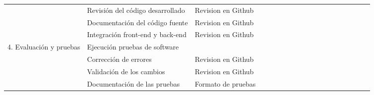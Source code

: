 \begin{table}[H]
\begin{adjustbox}{width={\textwidth},totalheight={\textheight},keepaspectratio}
\begin{tabular}{cp{10.555em}p{10.555em}rrrrrrrrrrrrrrrr}
        \cline{2-3}  & Revisión del código desarrollado & Revision en Github & \cellcolor[rgb]{ .886,  .937,  .855} & \cellcolor[rgb]{ .886,  .937,  .855} & \cellcolor[rgb]{ .886,  .937,  .855} & \cellcolor[rgb]{ .886,  .937,  .855} &   &   &   &   &   &   &   &   &   &   &   &  \bigstrut\\
        \cline{2-3}  & Documentación del código fuente & Revision en Github &   &   &   & \cellcolor[rgb]{ .663,  .816,  .557} & \cellcolor[rgb]{ .663,  .816,  .557} & \cellcolor[rgb]{ .663,  .816,  .557} &   &   &   &   &   &   &   &   &   &  \bigstrut\\
        \cline{2-3}  & Integración front-end y back-end & Revision en Github &   &   &   & \cellcolor[rgb]{ .886,  .937,  .855}\textcolor[rgb]{ .886,  .937,  .855}{} & \cellcolor[rgb]{ .886,  .937,  .855}\textcolor[rgb]{ .886,  .937,  .855}{} & \cellcolor[rgb]{ .886,  .937,  .855}\textcolor[rgb]{ .886,  .937,  .855}{} & \cellcolor[rgb]{ .886,  .937,  .855}\textcolor[rgb]{ .886,  .937,  .855}{} & \cellcolor[rgb]{ .886,  .937,  .855}\textcolor[rgb]{ .886,  .937,  .855}{} &   &   &   &   &   &   &   &  \bigstrut\\
        \cline{1-3}\multicolumn{1}{c}{\multirow{4}[8]{*}{4. Evaluación y pruebas}} & Ejecución pruebas de software & \multicolumn{1}{r}{} &   &   &   &   &   &   & \cellcolor[rgb]{ .878,  .639,  .953} & \cellcolor[rgb]{ .878,  .639,  .953} & \cellcolor[rgb]{ .878,  .639,  .953} & \cellcolor[rgb]{ .878,  .639,  .953} &   &   &   &   &   &  \bigstrut\\
        \cline{2-3}  & Corrección de errores & Revision en Github &   &   &   &   &   &   & \cellcolor[rgb]{ .941,  .804,  .984} & \cellcolor[rgb]{ .941,  .804,  .984} & \cellcolor[rgb]{ .941,  .804,  .984} & \cellcolor[rgb]{ .941,  .804,  .984} & \cellcolor[rgb]{ .941,  .804,  .984} & \cellcolor[rgb]{ .941,  .804,  .984} &   &   &   &  \bigstrut\\
        \cline{2-3}  & Validación de los cambios & Revision en Github &   &   &   &   &   &   &   & \cellcolor[rgb]{ .878,  .639,  .953} & \cellcolor[rgb]{ .878,  .639,  .953} & \cellcolor[rgb]{ .878,  .639,  .953} & \cellcolor[rgb]{ .878,  .639,  .953} & \cellcolor[rgb]{ .878,  .639,  .953} &   &   &   &  \bigstrut\\
        \cline{2-3}  & Documentación de las pruebas & Formato de pruebas &   &   &   &   &   &   &   &   &   & \cellcolor[rgb]{ .941,  .804,  .984} & \cellcolor[rgb]{ .941,  .804,  .984} & \cellcolor[rgb]{ .941,  .804,  .984} &   &   &   &  \bigstrut\\

\end{tabular}
\end{adjustbox}
\end{table}

